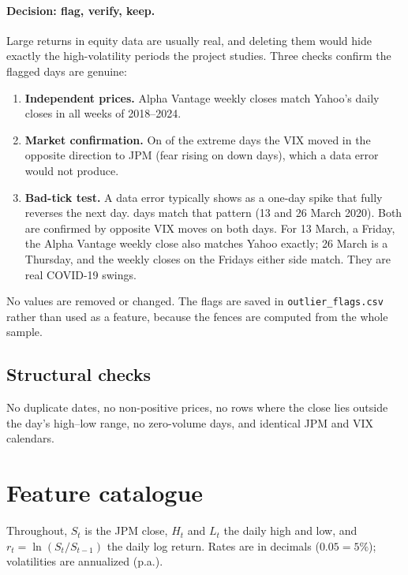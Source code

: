 \documentclass[11pt]{article}
\newcommand{\code}[1]{\texttt{#1}}
\begin{document}
\paragraph{Decision: flag, verify, keep.} Large returns in equity data are usually real, and deleting them would hide
exactly the high-volatility periods the project studies. Three checks confirm the flagged days are genuine:
\begin{enumerate}
  \item \textbf{Independent prices.} Alpha Vantage weekly closes match Yahoo's daily closes in all \wWeeklymatched{}
        weeks of 2018--2024.
  \item \textbf{Market confirmation.} On \wFlagsthreeoppvix{} of the \wFlagsthree{} extreme days the VIX moved in
        the opposite direction to JPM (fear rising on down days), which a data error would not produce.
  \item \textbf{Bad-tick test.} A data error typically shows as a one-day spike that fully reverses the next day.
        \wReversals{} days match that pattern (13 and 26 March 2020). Both are confirmed by opposite VIX moves on
        both days. For 13 March, a Friday, the Alpha Vantage weekly close also matches Yahoo exactly; 26 March is a
        Thursday, and the weekly closes on the Fridays either side match. They are real COVID-19 swings.
\end{enumerate}
No values are removed or changed. The flags are saved in \code{outlier\_flags.csv} rather than used as a feature,
because the fences are computed from the whole sample.

\subsection{Structural checks}
No duplicate dates, no non-positive prices, no rows where the close lies outside the day's high--low range, no
zero-volume days, and identical JPM and VIX calendars.

\section{Feature catalogue}
Throughout, $S_t$ is the JPM close, $H_t$ and $L_t$ the daily high and low, and $r_t=\ln(S_t/S_{t-1})$ the daily log
return. Rates are in decimals ($0.05 = 5\%$); volatilities are annualized (p.a.).
\end{document}
